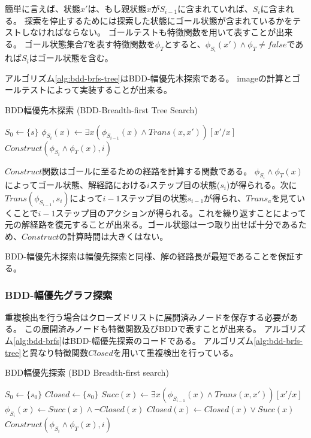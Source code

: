 簡単に言えば、状態$x'$は、もし親状態$x$が$S_{i-1}$に含まれていれば、$S_i$に含まれる。
探索を停止するためには探索した状態にゴール状態が含まれているかをテストしなければならない。
ゴールテストも特徴関数を用いて表すことが出来る。
ゴール状態集合$T$を表す特徴関数を$\phi_T$とすると、$\phi_{S_i}(x') \land \phi_T \neq false$であれば$S_i$はゴール状態を含む。

アルゴリズム\ref{alg:bdd-brfs-tree}はBDD-幅優先木探索である。
imageの計算とゴールテストによって実装することが出来る。


\begin{algorithm}
\caption{BDD幅優先木探索 (BDD-Breadth-first Tree Search)}
\label{alg:bdd-brfs-tree}
	$S_0 \leftarrow \{s\}$\;
	 {
		$\phi_{S_i}(x) \leftarrow \exists x (\phi_{S_{i-1}}(x) \land Trans(x,x'))[x'/x]$\;
		 {
			\Return $Construct(\phi_{S_i} \land \phi_T(x), i)$\;
		}
	}
\end{algorithm}


$Construct$関数はゴールに至るための経路を計算する関数である。
$\phi_{S_i} \land \phi_T(x)$によってゴール状態、解経路における$i$ステップ目の状態($s_i$)が得られる。次に$Trans(\phi_{S_{i-1}}, s_i)$によって$i-1$ステップ目の状態$s_{i-1}$が得られ、$Trans_a$を見ていくことで$i-1$ステップ目のアクションが得られる。これを繰り返すことによって元の解経路を復元することが出来る。ゴール状態は一つ取り出せば十分であるため、$Construct$の計算時間は大きくはない。

BDD-幅優先木探索は幅優先探索と同様、解の経路長が最短であることを保証する。


\subsubsection{BDD-幅優先グラフ探索}

重複検出を行う場合はクローズドリストに展開済みノードを保存する必要がある。
この展開済みノードも特徴関数及びBDDで表すことが出来る。
アルゴリズム\ref{alg:bdd-brfs}はBDD-幅優先探索のコードである。
アルゴリズム\ref{alg:bdd-brfs-tree}と異なり特徴関数$Closed$を用いて重複検出を行っている。

\begin{algorithm}
\caption{BDD幅優先探索 (BDD Breadth-first search)}
\label{alg:bdd-brfs}
	$S_0 \leftarrow \{s_0\}$\;
	$Closed \leftarrow \{s_0\}$\;
	 {
		$Succ(x) \leftarrow \exists x (\phi_{S_{i-1}}(x) \land Trans(x,x'))[x'/x]$\;
		$\phi_{S_i}(x) \leftarrow Succ(x) \land \lnot Closed(x)$\;
		$Closed(x) \leftarrow Closed(x) \lor Succ(x)$\;
		 {
			\Return $Construct(\phi_{S_i} \land \phi_T(x), i)$\;
		}
	}
\end{algorithm}

